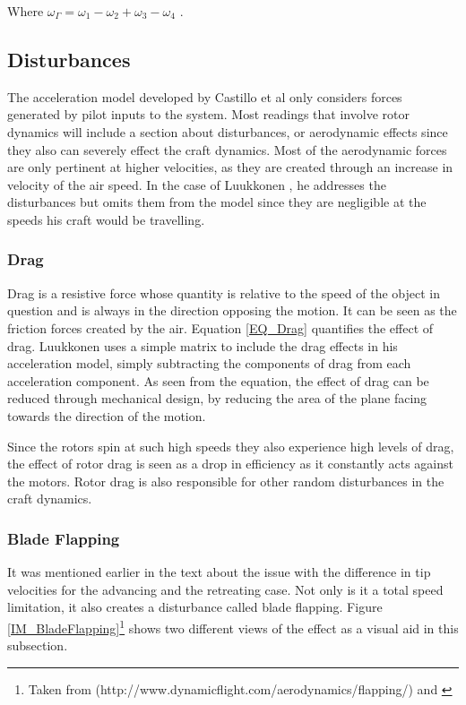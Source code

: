 		Where $\omega_\Gamma = \omega_1 - \omega_2 + \omega_3 - \omega_4$ \cite{Luukkonen}.
	
\subsection{Disturbances}
The acceleration model developed by Castillo et al \cite{MiniFlying} only considers forces generated by pilot inputs to the system. Most readings that involve rotor dynamics will include a section about disturbances, or aerodynamic effects \cite{Hoffmann, Pounds2006, Luukkonen, NearWall} since they also can severely effect the craft dynamics. Most of the aerodynamic forces are only pertinent at higher velocities, as they are created through an increase in velocity of the air speed. In the case of Luukkonen \cite{Luukkonen}, he addresses the disturbances but omits them from the model since they are negligible at the speeds his craft would be travelling.

\subsubsection{Drag}
Drag is a resistive force whose quantity is relative to the speed of the object in question and is always in the direction opposing the motion. It can be seen as the friction forces created by the air. Equation \ref{EQ_Drag} quantifies the effect of drag. Luukkonen \cite{Luukkonen} uses a simple matrix to include the drag effects in his acceleration model, simply subtracting the components of drag from each acceleration component. As seen from the equation, the effect of drag can be reduced through mechanical design, by reducing the area of the plane facing towards the direction of the motion. 

Since the rotors spin at such high speeds they also experience high levels of drag, the effect of rotor drag is seen as a drop in efficiency as it constantly acts against the motors. Rotor drag is also responsible for other random disturbances in the craft dynamics.

\subsubsection{Blade Flapping}
It was mentioned earlier in the text about the issue with the difference in tip velocities for the advancing and the retreating case. Not only is it a total speed limitation, it also creates a disturbance called blade flapping. Figure \ref{IM_BladeFlapping}\footnote{Taken from (http://www.dynamicflight.com/aerodynamics/flapping/) and \cite{Hoffmann}} shows two different views of the effect as a visual aid in this subsection. 

